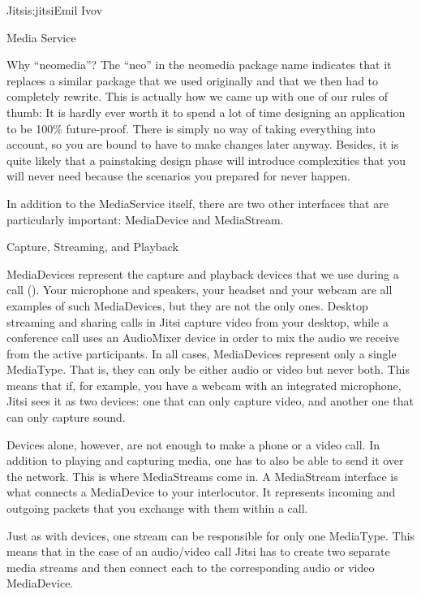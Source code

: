 \begin{aosachapter}{Jitsi}{s:jitsi}{Emil Ivov}
\begin{aosasect1}{Media Service}
\begin{aosabox}{Why ``neomedia''?}
The ``neo'' in the neomedia package name indicates that it replaces a
similar package that we used originally and that we then had to
completely rewrite. This is actually how we came up with one of our
rules of thumb: It is hardly ever worth it to spend a lot of time
designing an application to be 100\% future-proof. There is simply no
way of taking everything into account, so you are bound to have to
make changes later anyway. Besides, it is quite likely that a
painstaking design phase will introduce complexities that you will
never need because the scenarios you prepared for never happen.

\end{aosabox}

In addition to the MediaService itself, there are two other interfaces
that are particularly important: MediaDevice and MediaStream.

\begin{aosasect2}{Capture, Streaming, and Playback}

MediaDevices represent the capture and playback devices that we use
during a call (). Your microphone and
speakers, your headset and your webcam are all examples of such
MediaDevices, but they are not the only ones.  Desktop streaming and
sharing calls in Jitsi capture video from your desktop, while a
conference call uses an AudioMixer device in order to mix the audio we
receive from the active participants. In all cases, MediaDevices
represent only a single MediaType. That is, they can only be either
audio or video but never both. This means that if, for example, you
have a webcam with an integrated microphone, Jitsi sees it as two
devices: one that can only capture video, and another one that can
only capture sound.

Devices alone, however, are not enough to make a phone or a video
call.  In addition to playing and capturing media, one has to also be
able to send it over the network. This is where MediaStreams come
in. A MediaStream interface is what connects a MediaDevice to your
interlocutor. It represents incoming and outgoing packets that you
exchange with them within a call.

Just as with devices, one stream can be responsible for only one
MediaType. This means that in the case of an audio/video call Jitsi
has to create two separate media streams and then connect each to the
corresponding audio or video MediaDevice.



\end{aosasect2}
\end{aosasect1}
\end{aosachapter}
